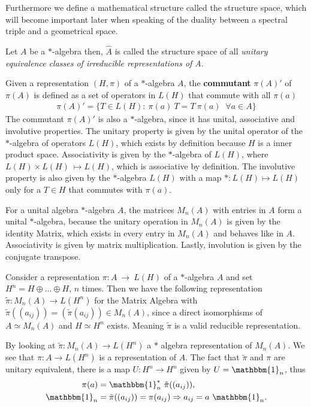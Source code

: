 Furthermore we define a mathematical structure called the structure space,
which will become important later when speaking of the duality between a
spectral triple and a geometrical space.
\begin{mydefinition}
    Let $A$ be a $*$-algebra then, $\hat{A}$ is called the structure space of all \textit{unitary equivalence classes
    of irreducible representations of A}.
\end{mydefinition}
    Given a representation $(H, \pi)$ of a $*$-algebra $A$, the \textbf{commutant} $\pi (A)'$ of $\pi (A)$ is defined as a set
    of operators in $L(H)$ that commute with all $\pi (a)$
    \begin{align}
        \pi (A)' = \big\{T \in L(H):\ \pi(a)\ T = T\ \pi(a) \;\; \forall a\in
        A\big\}
    \end{align}
    The commutant $\pi (A)'$ is also a $*$-algebra, since it has unital,
    associative and involutive properties.  The unitary property is given by
    the unital operator of the $*$-algebra of operators $L(H)$, which exists
    by definition because $H$ is a inner product space. Associativity is
    given by the $*$-algebra of $L(H)$, where $L(H) \times L(H)~\mapsto
    L(H)$, which is associative by definition. The involutive property is
    also given by the $*$-algebra $L(H)$ with a map $*: L(H) \mapsto L(H)$
    only for a $T \in H$ that commutes with $\pi (a)$.

    For a unital algebra $*$-algebra $A$, the matrices $M_n(A)$ with entries
    in $A$ form a unital $*$-algebra, because the unitary operation in
    $M_n(A)$ is given by the identity Matrix, which exists in every
    entry in $M_n(A)$ and behaves like in $A$. Associativity is given by
    matrix multiplication. Lastly, involution is given by the conjugate
    transpose.

    Consider a representation $\pi :A\ \rightarrow \ L(H)$ of a $*$-algebra
    $A$ and set $H^n = H \oplus ... \oplus H$, $n$ times. Then we have the following
    representation $\tilde{\pi}:M_n(A) \rightarrow L(H^n)$ for the Matrix
    Algebra with $\tilde{\pi}((a_{ij})) = (\tilde{\pi}(a_{ij})) \in M_n(A)$,
    since a direct isomorphisms of $A \simeq M_n(A)$ and $H \simeq H^n$
    exists. Meaning $\tilde{\pi}$ is a valid reducible representation.

    By looking at $\tilde{\pi}:M_n(A) \rightarrow L(H^n)$ a $*$ algebra
    representation of $M_n(A)$. We see that $\pi: A \rightarrow L(H^n)$ is a representation of $A$.
    The fact that $\tilde{\pi}$ and $\pi$ are unitary equivalent, there is
    a map $U: H^n \rightarrow H^n$ given by $U=\mathbbm{1}_n$, thus
    \begin{align}
        \pi (a) &= \mathbbm{1}_n^*\ \tilde{\pi}((a_{ij})), \\
        \mathbbm{1}_n &= \tilde{\pi}((a_{ij})) = \pi (a_{ij})
    \Rightarrow a_{ij} = a\ \mathbbm{1}_n.
    \end{align}


